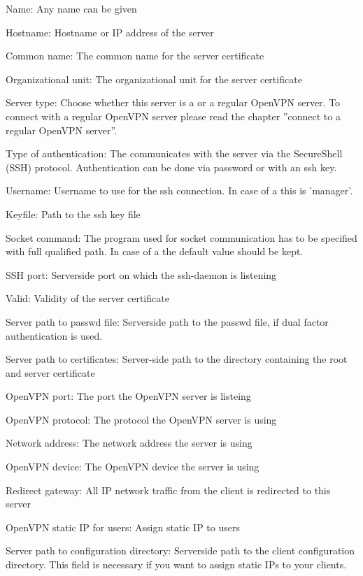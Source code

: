 \begin{items}
	\item Name: Any name can be given
	\item Hostname: Hostname or IP address of the server
	\item Common name: The common name for the server certificate
    \item Organizational unit: The organizational unit for the server certificate
	\item Server type: Choose whether this server is a \Nboa{} or a regular
          OpenVPN server. To connect with a regular OpenVPN server please
          read the chapter ''connect to a regular OpenVPN server''.
	\item Type of authentication: The \Nbm{} communicates with the server
          via the SecureShell (SSH) protocol. Authentication can be done
          via password or with an ssh key.
	\item Username: Username to use for the ssh connection. In case of a
          \Nboa{} this is 'manager'.
	\item Keyfile: Path to the ssh key file
	\item Socket command: The program used for socket communication has to
          be specified with full qualified path. In case of a \Nboa{} the
          default value should be kept.
	\item SSH port: Serverside port on which the ssh-daemon is listening
	\item Valid: Validity of the server certificate
	\item Server path to passwd file: Serverside path to the passwd file,
          if dual factor authentication is used.
	\item Server path to certificates: Server-side path to the directory
	containing the root and server certificate
	\item OpenVPN port: The port the OpenVPN server is listeing
	\item OpenVPN protocol: The protocol the OpenVPN server is using
	\item Network address: 	The network address the server is using
	\item OpenVPN device: The OpenVPN device the server is using
	\item Redirect gateway: All IP network traffic from the client is
	redirected to this server
	\item OpenVPN static IP for users: Assign static IP to users
	\item Server path to configuration directory: Serverside path to the
	client configuration directory. This field is necessary if you want to
	assign static IPs to your clients.
\end{items}


